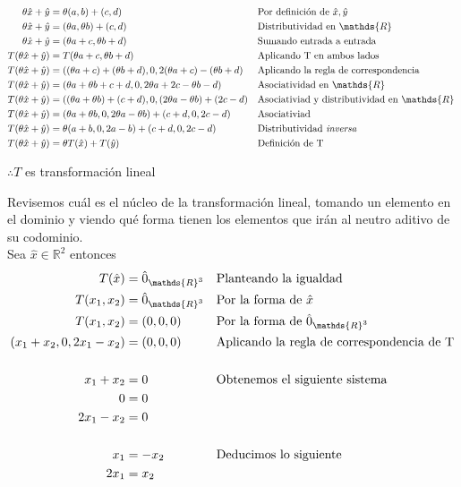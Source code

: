 \documentclass[letterpaper]{article}
\newcommand{\R}{\mathds{R}}
\renewcommand{\*}{\cdot}
\theoremstyle{definition}
\begin{document}
	\begin{align*}
		\theta \hat{x} + \hat{y} &= \theta(a,b) + (c,d) &&\text{Por definición de $ \hat{x}, \hat{y} $}\\
		\theta \hat{x} + \hat{y} &= (\theta a,\theta b) + (c,d) &&\text{Distributividad en $ \R $ }\\
		\theta \hat{x} + \hat{y} &= (\theta a + c,\theta b + d) &&\text{Sumando entrada a entrada }\\
		T(\theta \hat{x} + \hat{y}) &= T(\theta a + c,\theta b + d) &&\text{Aplicando T en ambos lados }\\
		T(\theta \hat{x} + \hat{y}) &= ((\theta a + c) + (\theta b + d), 0, 2(\theta a + c) - (\theta b + d) &&\text{Aplicando la regla de correspondencia }\\
		T(\theta \hat{x} + \hat{y}) &= (\theta a +\theta b + c + d, 0, 2\theta a + 2c - \theta b - d) &&\text{Asociatividad en $ \R $ }\\
		T(\theta \hat{x} + \hat{y}) &= ((\theta a +\theta b) + (c + d), 0, (2\theta a - \theta b) + (2c - d) &&\text{Asociativiad y distributividad en $ \R $ }\\
		T(\theta \hat{x} + \hat{y}) &=  (\theta a +\theta b, 0, 2\theta a - \theta b) + (c + d, 0, 2c - d) &&\text{Asociativiad}\\
		T(\theta \hat{x} + \hat{y}) &=  \theta(a +b, 0, 2a - b) + (c + d, 0, 2c - d) &&\text{Distributividad \textit{inversa}}\\
		T(\theta \hat{x} + \hat{y}) &=  \theta T(\hat{x}) + T(\hat{y}) &&\text{Definición de T}
	\end{align*}
	\begin{center}
		$ \therefore T $ es transformación lineal
	\end{center}	
	
	Revisemos cuál es el núcleo de la transformación lineal, tomando un elemento en el dominio y viendo qué forma tienen los elementos que irán al neutro aditivo de su codominio.\\
	Sea $ \hat{x} \in \R^2$ entonces 
	\begin{align*}
		T(\hat{x}) & = \hat{0}_{\R^3} && \text{Planteando la igualdad} \\
		T(x_1, x_2) & = \hat{0}_{\R^3} && \text{Por la forma de $ \hat{x} $} \\
		T(x_1, x_2) & = (0,0,0) && \text{Por la forma de $ \hat{0}_{\R^3} $} \\
		(x_1 + x_2 ,0, 2x_1 - x_2) & = (0,0,0) && \text{Aplicando la regla de correspondencia de T} \\
		\\
		x_1 + x_2 & = 0 && \text{Obtenemos el siguiente sistema} \\
		0 & = 0 && \text{  } \\
		2x_1 - x_2 & = 0 && \text{ } \\
		\\
		x_1  & =  - x_2 && \text{Deducimos lo siguiente} \\
		2x_1 & =  x_2 && \text{ } \\
	\end{align*}
	
\end{document}
